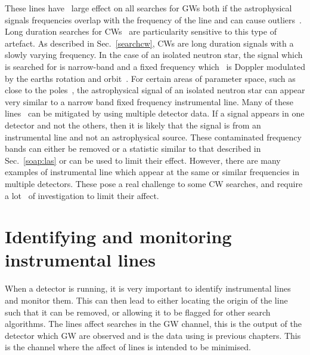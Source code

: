 %

These lines have~ large effect on all searches for \glspl{GW} both if
the astrophysical signals frequencies overlap with the frequency of the line
and can cause outliers~.  Long duration searches for \glspl{CW}~ are
particularity sensitive to this type of artefact.  As described in
Sec.~\ref{searchcw}, \glspl{CW} are long duration signals with a slowly varying
frequency.  In the case of an isolated neutron star, the signal which is
searched for is narrow-band and a fixed frequency which~ is Doppler modulated by
the earths rotation and orbit~. For certain areas of parameter space, such as
close to the poles~, the astrophysical signal of an isolated neutron star can
appear very similar to a narrow band fixed frequency instrumental line.  Many
of these lines~ can be mitigated by using multiple detector data. If a signal
appears in one detector and not the others, then it is likely that the signal
is from an instrumental line and not an astrophysical source.  These
contaminated frequency bands can either be removed or a statistic similar to
that described in Sec.~\ref{soap:las} or \citep{keitel2014SearchContinuous} can
be used to limit their effect.  However, there are many examples of
instrumental line which appear at the same or similar frequencies in multiple
detectors.  These pose a real challenge to some \gls{CW} searches, and require
a lot~ of investigation to limit their affect.

\section{\label{detchar:monitor}Identifying and monitoring instrumental lines}
%

When a detector is running, it is very important to identify instrumental lines and monitor them.
This can then lead to either locating the origin of the line such that it can be removed, or allowing it to be flagged for other search algorithms.
The lines affect searches in the \gls{GW} channel, this is the output of the detector which \gls{GW} are observed and is the data using is previous chapters.
This is the channel where the affect of lines is intended to be minimised.

